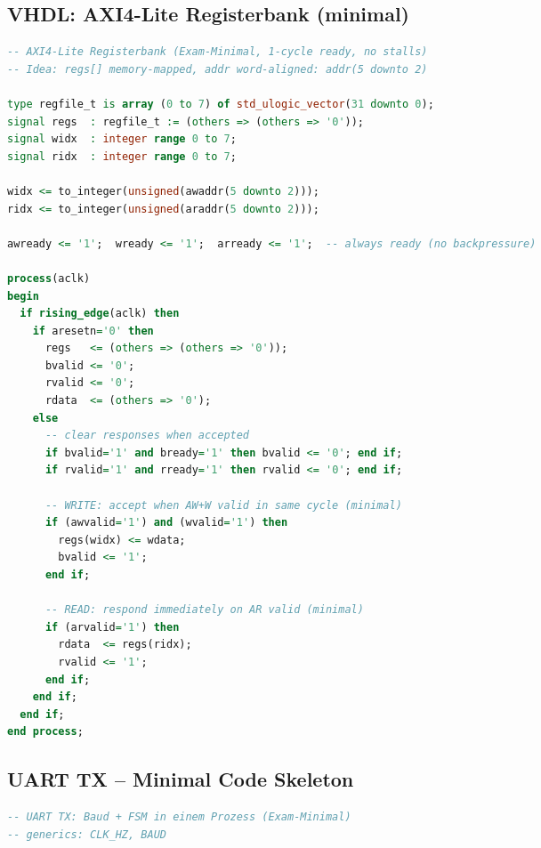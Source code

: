 \documentclass[10pt,a4paper]{article}
\begin{document}
\begin{multicols}{3}
\subsection{VHDL: AXI4-Lite Registerbank (minimal)}
\begin{lstlisting}[language=VHDL,emph={AWVALID,AWREADY,WVALID,WREADY,BVALID,BREADY,ARVALID,ARREADY,RVALID,RREADY,ADDR,WDATA,RDATA,process,rising_edge},emphstyle=\bfseries\color{codeemph}]
-- AXI4-Lite Registerbank (Exam-Minimal, 1-cycle ready, no stalls)
-- Idea: regs[] memory-mapped, addr word-aligned: addr(5 downto 2)

type regfile_t is array (0 to 7) of std_ulogic_vector(31 downto 0);
signal regs  : regfile_t := (others => (others => '0'));
signal widx  : integer range 0 to 7;
signal ridx  : integer range 0 to 7;

widx <= to_integer(unsigned(awaddr(5 downto 2)));
ridx <= to_integer(unsigned(araddr(5 downto 2)));

awready <= '1';  wready <= '1';  arready <= '1';  -- always ready (no backpressure)

process(aclk)
begin
  if rising_edge(aclk) then
    if aresetn='0' then
      regs   <= (others => (others => '0'));
      bvalid <= '0';
      rvalid <= '0';
      rdata  <= (others => '0');
    else
      -- clear responses when accepted
      if bvalid='1' and bready='1' then bvalid <= '0'; end if;
      if rvalid='1' and rready='1' then rvalid <= '0'; end if;

      -- WRITE: accept when AW+W valid in same cycle (minimal)
      if (awvalid='1') and (wvalid='1') then
        regs(widx) <= wdata;
        bvalid <= '1';
      end if;

      -- READ: respond immediately on AR valid (minimal)
      if (arvalid='1') then
        rdata  <= regs(ridx);
        rvalid <= '1';
      end if;
    end if;
  end if;
end process;

\end{lstlisting}
\subsection*{UART TX – Minimal Code Skeleton}



\begin{lstlisting}[language=VHDL,emph={generic,CLK_HZ,BAUD,process,rising_edge,signal,constant},emphstyle=\bfseries\color{codeemph}]
-- UART TX: Baud + FSM in einem Prozess (Exam-Minimal)
-- generics: CLK_HZ, BAUD


\end{lstlisting}
\end{multicols}
\end{document}
